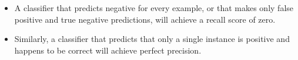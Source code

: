 \documentclass[PredictiveAnalytics101.tex]{subfiles}
\begin{document}
\begin{frame}
	
	\begin{itemize}
\item A classifier that predicts negative for every example, or that makes only false positive
and true negative predictions, will achieve a recall score of zero. 
\item Similarly, a classifier
that predicts that only a single instance is positive and happens to be correct will
achieve perfect precision.
	\end{itemize}

\end{frame}
\end{document}

